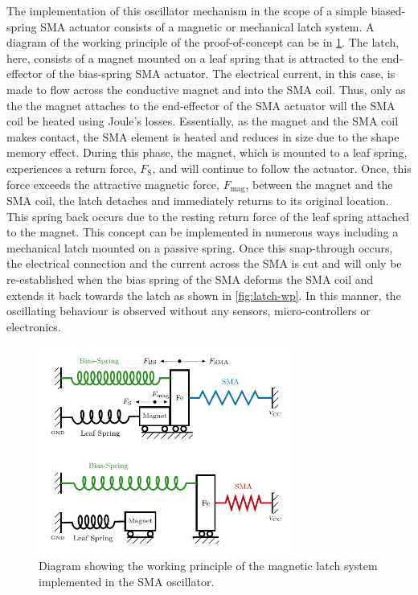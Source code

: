 The implementation of this oscillator mechanism in the scope of a simple biased-spring SMA actuator consists of a magnetic or mechanical latch system. A diagram of the working principle of the proof-of-concept can be in \cref{fig:oscillator-schematic}. The latch, here, consists of a magnet mounted on a leaf spring that is attracted to the end-effector of the bias-spring SMA actuator. The electrical current, in this case, is made to flow across the conductive magnet and into the SMA coil. Thus, only as the the magnet attaches to the end-effector of the SMA actuator will the SMA coil be heated using Joule's losses. Essentially, as the magnet and the SMA coil makes contact, the SMA element is heated and reduces in size due to the shape memory effect. During this phase, the magnet, which is mounted to a leaf spring, experiences a return force, $F_\textrm{S}$, and will continue to follow the actuator. Once, this force exceeds the attractive magnetic force, $F_\textrm{mag}$, between the magnet and the SMA coil, the latch detaches and immediately returns to its original location. This spring back occurs due to the resting return force of the leaf spring attached to the magnet. This concept can be implemented in numerous ways including a mechanical latch mounted on a passive spring. Once this snap-through occurs, the electrical connection and the current across the SMA is cut and will only be re-established when the bias spring of the SMA deforms the SMA coil and extends it back towards the latch as shown in \cref{fig:latch-wp}. In this manner, the oscillating behaviour is observed without any sensors, micro-controllers or electronics.

\begin{figure}[hbt!] %
  \centering
  \includegraphics[width=0.75\textwidth]{images/chap4/oscillator-wp-diagram.pdf}
  \caption{Diagram showing the working principle of the magnetic latch system implemented in the SMA oscillator.}
  \label{fig:oscillator-schematic}
\end{figure}

